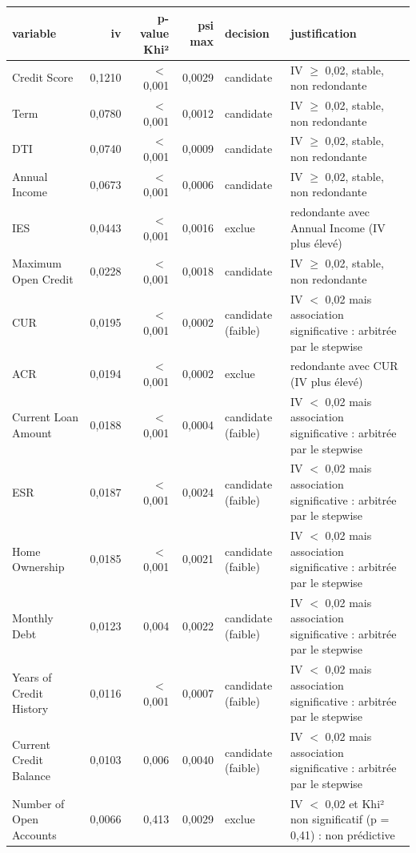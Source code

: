 \begin{tabular}{lrrrlp{6.2cm}}
\toprule
\textbf{variable} & \textbf{iv} & \textbf{p-value Khi²} & \textbf{psi max} & \textbf{decision} & \textbf{justification} \\
\midrule
Credit Score & 0,1210 & $<$\,0,001 & 0,0029 & candidate & IV $\geq$ 0,02, stable, non redondante \\
Term & 0,0780 & $<$\,0,001 & 0,0012 & candidate & IV $\geq$ 0,02, stable, non redondante \\
DTI & 0,0740 & $<$\,0,001 & 0,0009 & candidate & IV $\geq$ 0,02, stable, non redondante \\
Annual Income & 0,0673 & $<$\,0,001 & 0,0006 & candidate & IV $\geq$ 0,02, stable, non redondante \\
IES & 0,0443 & $<$\,0,001 & 0,0016 & exclue & redondante avec Annual Income (IV plus élevé) \\
Maximum Open Credit & 0,0228 & $<$\,0,001 & 0,0018 & candidate & IV $\geq$ 0,02, stable, non redondante \\
CUR & 0,0195 & $<$\,0,001 & 0,0002 & candidate (faible) & IV $<$ 0,02 mais association significative : arbitrée par le stepwise \\
ACR & 0,0194 & $<$\,0,001 & 0,0002 & exclue & redondante avec CUR (IV plus élevé) \\
Current Loan Amount & 0,0188 & $<$\,0,001 & 0,0004 & candidate (faible) & IV $<$ 0,02 mais association significative : arbitrée par le stepwise \\
ESR & 0,0187 & $<$\,0,001 & 0,0024 & candidate (faible) & IV $<$ 0,02 mais association significative : arbitrée par le stepwise \\
Home Ownership & 0,0185 & $<$\,0,001 & 0,0021 & candidate (faible) & IV $<$ 0,02 mais association significative : arbitrée par le stepwise \\
Monthly Debt & 0,0123 & 0,004 & 0,0022 & candidate (faible) & IV $<$ 0,02 mais association significative : arbitrée par le stepwise \\
Years of Credit History & 0,0116 & $<$\,0,001 & 0,0007 & candidate (faible) & IV $<$ 0,02 mais association significative : arbitrée par le stepwise \\
Current Credit Balance & 0,0103 & 0,006 & 0,0040 & candidate (faible) & IV $<$ 0,02 mais association significative : arbitrée par le stepwise \\
Number of Open Accounts & 0,0066 & 0,413 & 0,0029 & exclue & IV $<$ 0,02 et Khi² non significatif (p = 0,41) : non prédictive \\

\end{tabular}
